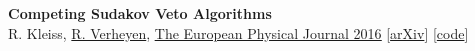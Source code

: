 \documentclass[a4paper,12pt]{article}
\begin{document}
\textbf{Competing Sudakov Veto Algorithms} \\
R. Kleiss, \underline{R. Verheyen},
\href{https://link.springer.com/article/10.1140/epjc/s10052-016-4231-5}{\underline{The European Physical Journal 2016}} [\href{https://arxiv.org/pdf/1605.09246.pdf}{arXiv}] [\href{https://github.com/rbvh/Veto-Algorithm-Toy-Shower}{code}]





\end{document}
